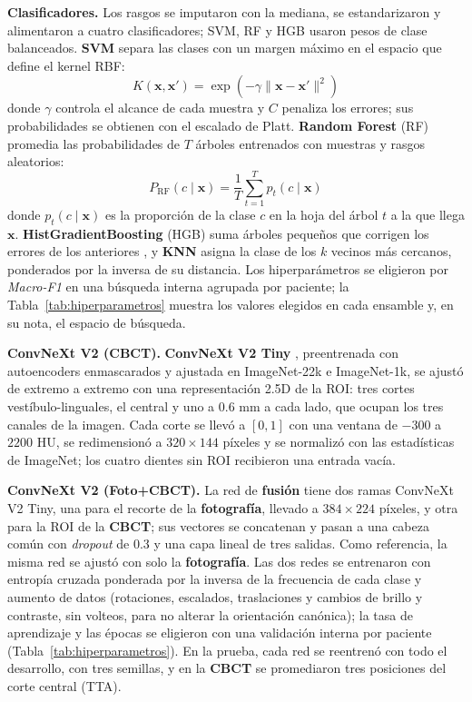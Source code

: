 \documentclass[runningheads]{llncs}
\newcommand{\sol}[1]{\textcolor{solucion}{\textbf{#1}}}
\newcommand{\dat}[1]{\textcolor{dataset}{\textbf{#1}}}
\newcommand{\sol}[1]{#1}
\newcommand{\dat}[1]{#1}
\begin{document}
\textbf{Clasificadores.} Los rasgos se imputaron con la mediana, se
estandarizaron y alimentaron a cuatro clasificadores; SVM, RF y HGB
usaron pesos de clase balanceados. \sol{SVM} \cite{cortes1995svm} separa las clases con un
margen máximo en el espacio que define el kernel RBF:
\begin{equation}
K(\mathbf{x}, \mathbf{x}') = \exp\left(-\gamma \lVert \mathbf{x} -
\mathbf{x}' \rVert^2\right)
\label{eq:rbf}
\end{equation}
donde $\gamma$ controla el alcance de cada muestra y $C$ penaliza los
errores; sus probabilidades se obtienen con el escalado de Platt.
\sol{Random Forest} (RF) \cite{breiman2001rf} promedia las probabilidades
de $T$ árboles entrenados con muestras y rasgos aleatorios:
\begin{equation}
P_{\mathrm{RF}}(c \mid \mathbf{x}) = \frac{1}{T} \sum_{t=1}^{T} p_t(c
\mid \mathbf{x})
\label{eq:rf}
\end{equation}
donde $p_t(c \mid \mathbf{x})$ es la proporción de la clase $c$ en la hoja
del árbol $t$ a la que llega $\mathbf{x}$. \sol{HistGradientBoosting}
(HGB) suma árboles pequeños que corrigen los errores de los anteriores
\cite{friedman2001gbm}, y \sol{KNN} \cite{cover1967knn} asigna la clase
de los $k$ vecinos más cercanos, ponderados por la inversa de su
distancia. Los hiperparámetros se eligieron por \textit{Macro-F1} en una
búsqueda interna agrupada por paciente; la
Tabla~\ref{tab:hiperparametros} muestra los valores elegidos en cada
ensamble y, en su nota, el espacio de búsqueda.

\textbf{ConvNeXt V2 (CBCT).} \sol{ConvNeXt V2 Tiny}
\cite{woo2023convnextv2}, preentrenada con autoencoders enmascarados y
ajustada en ImageNet-22k e ImageNet-1k, se ajustó de extremo a extremo
con una representación 2.5D de la ROI: tres cortes vestíbulo-linguales,
el central y uno a 0.6 mm a cada lado, que ocupan los tres canales de la
imagen. Cada corte se llevó a $[0, 1]$ con una ventana de $-300$ a
$2200$ HU, se redimensionó a $320 \times 144$ píxeles y se normalizó con
las estadísticas de ImageNet; los cuatro dientes sin ROI recibieron una
entrada vacía.

\textbf{ConvNeXt V2 (Foto+CBCT).} La red de \dat{fusión} tiene dos ramas
ConvNeXt V2 Tiny, una para el recorte de la \dat{fotografía}, llevado a
$384 \times 224$ píxeles, y otra para la ROI de la \dat{CBCT}; sus
vectores se concatenan y pasan a una cabeza común con
\textit{dropout} de 0.3 y una capa lineal de tres salidas. Como
referencia, la misma red se ajustó con solo la \dat{fotografía}. Las dos
redes se entrenaron con entropía cruzada ponderada por la inversa de la
frecuencia de cada clase y aumento de datos (rotaciones, escalados,
traslaciones y cambios de brillo y contraste, sin volteos, para no
alterar la orientación canónica); la tasa de aprendizaje y las épocas se
eligieron con una validación interna por paciente
(Tabla~\ref{tab:hiperparametros}). En la prueba, cada red se reentrenó
con todo el desarrollo, con tres semillas, y en la \dat{CBCT} se
promediaron tres posiciones del corte central (TTA).
\end{document}
